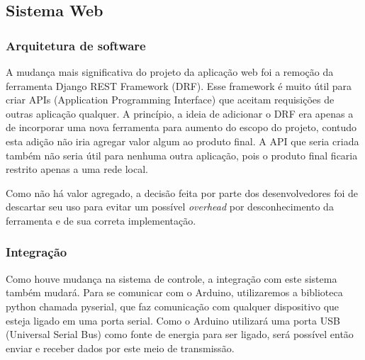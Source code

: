 \subsection{Sistema Web}
\subsubsection{Arquitetura de software}
A mudança mais significativa do projeto da aplicação web foi a remoção da ferramenta Django REST Framework (DRF). Esse framework é muito útil para criar APIs (Application Programming Interface) que aceitam requisições de outras aplicação qualquer. A princípio, a ideia de adicionar o DRF era apenas a de incorporar uma nova ferramenta para aumento do escopo do projeto, contudo esta adição não iria agregar valor algum ao produto final. A API que seria criada também não seria útil para nenhuma outra aplicação, pois o produto final ficaria restrito apenas a uma rede local.

Como não há valor agregado, a decisão feita por parte dos desenvolvedores foi de descartar seu uso para evitar um possível \textit{overhead} por desconhecimento da ferramenta e de sua correta implementação.

\subsubsection{Integração}
Como houve mudança na sistema de controle, a integração com este sistema também mudará. Para se comunicar com o Arduino, utilizaremos a biblioteca python chamada pyserial, que faz comunicação com qualquer dispositivo que esteja ligado em uma porta serial. Como o Arduino utilizará uma porta USB (Universal Serial Bus) como fonte de energia para ser ligado, será possível então enviar e receber dados por este meio de transmissão.
